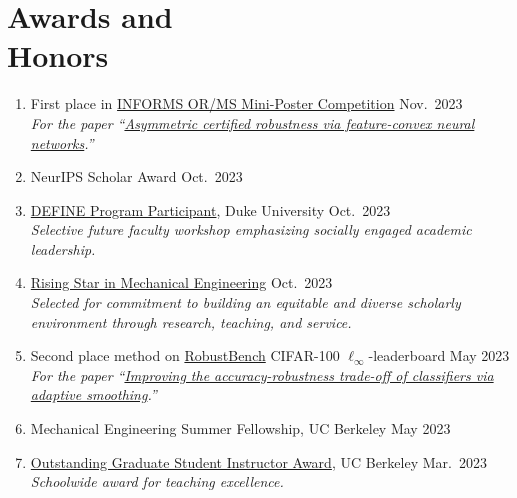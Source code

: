 \documentclass[11pt]{article}
\newcommand{\cvdate}[1]{\hfill#1}			%
\begin{document}
	\section{\texorpdfstring{Awards and \\[\baselineskip] Honors}{Awards and Honors}}
	\hfill\vspace*{-2\baselineskip}
	\begin{enumerate}[label={\arabic*.}]
		\item First place in \href{https://www.informs.org/Publications/OR-MS-Tomorrow/OR-MS-Tomorrow-Mini-Poster-Competition-2023-Winners}{INFORMS OR/MS Mini-Poster Competition}
		\cvdate{Nov.\ 2023} \\
		\textit{For the paper ``\href{https://arxiv.org/pdf/2302.01961.pdf}{Asymmetric certified robustness via feature-convex neural networks}.''}
		\item NeurIPS Scholar Award
		\cvdate{Oct.\ 2023}
		\item \href{https://sites.google.com/view/duke-engineering-define/home}{DEFINE Program Participant}, Duke University
		\cvdate{Oct.\ 2023} \\
		\textit{Selective future faculty workshop emphasizing socially engaged academic leadership.}
		\item \href{https://me.berkeley.edu/me-rising-stars/}{Rising Star in Mechanical Engineering}
		\cvdate{Oct.\ 2023} \\
		\textit{Selected for commitment to building an equitable and diverse scholarly environment through research, teaching, and service.}
		\item Second place method on \href{https://robustbench.github.io/#div_cifar100_Linf_heading}{RobustBench} CIFAR-100 $\ell_\infty$-leaderboard
		\cvdate{May 2023} \\
		\textit{For the paper ``\href{https://bai-yt.github.io/files/publications/AdaptiveSmoothing_PrePrint.pdf}{Improving the accuracy-robustness trade-off of classifiers via adaptive smoothing}.''}
		\item Mechanical Engineering Summer Fellowship, UC Berkeley
		\cvdate{May 2023}
		\item \href{https://gsi.berkeley.edu/programs-services/award-programs/ogsi/ogsi-recipients-2022-2023/}{Outstanding Graduate Student Instructor Award}, UC Berkeley
		\cvdate{Mar.\ 2023} \\
		\textit{Schoolwide award for teaching excellence.}

\end{enumerate}
\end{document}
